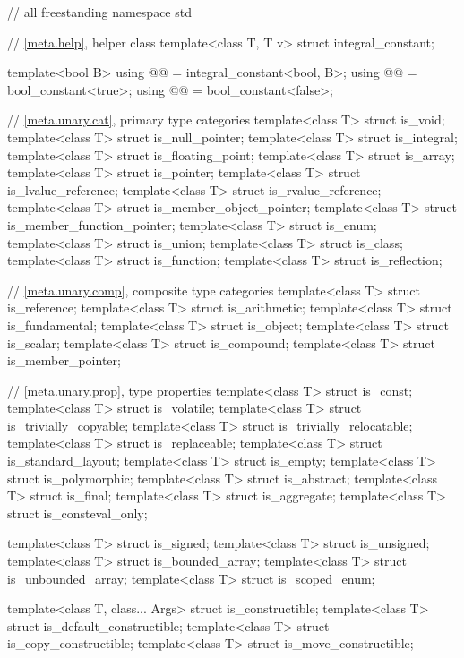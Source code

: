 %
\begin{codeblock}
// all freestanding
namespace std {
  // \ref{meta.help}, helper class
  template<class T, T v> struct integral_constant;

  template<bool B>
    using @@ = integral_constant<bool, B>;
  using @@  = bool_constant<true>;
  using @@ = bool_constant<false>;

  // \ref{meta.unary.cat}, primary type categories
  template<class T> struct is_void;
  template<class T> struct is_null_pointer;
  template<class T> struct is_integral;
  template<class T> struct is_floating_point;
  template<class T> struct is_array;
  template<class T> struct is_pointer;
  template<class T> struct is_lvalue_reference;
  template<class T> struct is_rvalue_reference;
  template<class T> struct is_member_object_pointer;
  template<class T> struct is_member_function_pointer;
  template<class T> struct is_enum;
  template<class T> struct is_union;
  template<class T> struct is_class;
  template<class T> struct is_function;
  template<class T> struct is_reflection;

  // \ref{meta.unary.comp}, composite type categories
  template<class T> struct is_reference;
  template<class T> struct is_arithmetic;
  template<class T> struct is_fundamental;
  template<class T> struct is_object;
  template<class T> struct is_scalar;
  template<class T> struct is_compound;
  template<class T> struct is_member_pointer;

  // \ref{meta.unary.prop}, type properties
  template<class T> struct is_const;
  template<class T> struct is_volatile;
  template<class T> struct is_trivially_copyable;
  template<class T> struct is_trivially_relocatable;
  template<class T> struct is_replaceable;
  template<class T> struct is_standard_layout;
  template<class T> struct is_empty;
  template<class T> struct is_polymorphic;
  template<class T> struct is_abstract;
  template<class T> struct is_final;
  template<class T> struct is_aggregate;
  template<class T> struct is_consteval_only;

  template<class T> struct is_signed;
  template<class T> struct is_unsigned;
  template<class T> struct is_bounded_array;
  template<class T> struct is_unbounded_array;
  template<class T> struct is_scoped_enum;

  template<class T, class... Args> struct is_constructible;
  template<class T> struct is_default_constructible;
  template<class T> struct is_copy_constructible;
  template<class T> struct is_move_constructible;

}
\end{codeblock}
